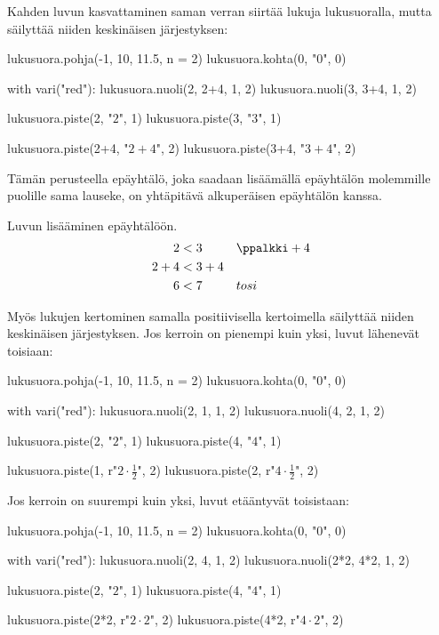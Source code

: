 Kahden luvun kasvattaminen saman verran siirtää lukuja lukusuoralla, mutta säilyttää niiden keskinäisen järjestyksen:

\begin{kuva}
lukusuora.pohja(-1, 10, 11.5, n = 2)
lukusuora.kohta(0, "$0$", 0)

with vari("red"):
	lukusuora.nuoli(2, 2+4, 1, 2)
	lukusuora.nuoli(3, 3+4, 1, 2)

lukusuora.piste(2, "$2$", 1)
lukusuora.piste(3, "$3$", 1)

lukusuora.piste(2+4, "$2\!+\!4$", 2)
lukusuora.piste(3+4, "$3\!+\!4$", 2)
\end{kuva}

Tämän perusteella epäyhtälö, joka saadaan lisäämällä epäyhtälön molemmille puolille sama lauseke, on yhtäpitävä alkuperäisen epäyhtälön kanssa.

\begin{esimerkki}
Luvun lisääminen epäyhtälöön.
  \begin{align*}
     2 &< 3 && \ppalkki +4\\
   2+4 &< 3+4  \\
     6 &< 7 && tosi
  \end{align*}
\end{esimerkki}

Myös lukujen kertominen samalla positiivisella kertoimella säilyttää niiden keskinäisen järjestyksen. Jos kerroin on pienempi kuin yksi, luvut lähenevät toisiaan:

\begin{kuva}
lukusuora.pohja(-1, 10, 11.5, n = 2)
lukusuora.kohta(0, "$0$", 0)

with vari("red"):
	lukusuora.nuoli(2, 1, 1, 2)
	lukusuora.nuoli(4, 2, 1, 2)

lukusuora.piste(2, "$2$", 1)
lukusuora.piste(4, "$4$", 1)

lukusuora.piste(1, r"$2 \cdot \frac{1}{2}$", 2)
lukusuora.piste(2, r"$4 \cdot \frac{1}{2}$", 2)
\end{kuva}

Jos kerroin on suurempi kuin yksi, luvut etääntyvät toisistaan:

\begin{kuva}
lukusuora.pohja(-1, 10, 11.5, n = 2)
lukusuora.kohta(0, "$0$", 0)

with vari("red"):
	lukusuora.nuoli(2, 4, 1, 2)
	lukusuora.nuoli(2*2, 4*2, 1, 2)

lukusuora.piste(2, "$2$", 1)
lukusuora.piste(4, "$4$", 1)

lukusuora.piste(2*2, r"$2 \cdot 2$", 2)
lukusuora.piste(4*2, r"$4 \cdot 2$", 2)
\end{kuva}

